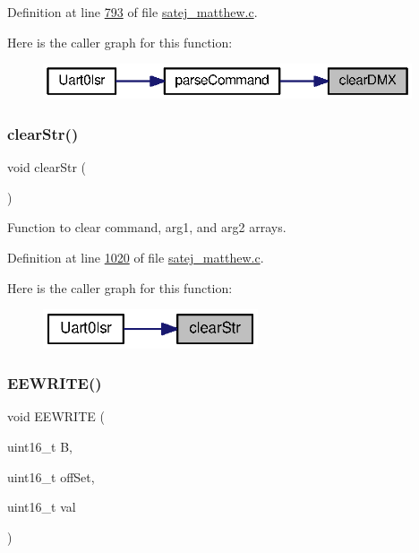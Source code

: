 Definition at line \mbox{\hyperlink{satej__matthew_8c_source_l00793}{793}} of file \mbox{\hyperlink{satej__matthew_8c_source}{satej\+\_\+matthew.\+c}}.

Here is the caller graph for this function\+:\nopagebreak
\begin{figure}[H]
\begin{center}
\leavevmode
\includegraphics[width=309pt]{satej__matthew_8c_a90f05ed3280bc7f2e971ed7216028960_icgraph}
\end{center}
\end{figure}
\mbox{\label{satej__matthew_8c_a595edd7ef79a70fc4dccbca4b2cf0deb}} 
\subsubsection{\texorpdfstring{clearStr()}{clearStr()}}
{\footnotesize\ttfamily void clear\+Str (\begin{DoxyParamCaption}{ }\end{DoxyParamCaption})}



Function to clear command, arg1, and arg2 arrays. 



Definition at line \mbox{\hyperlink{satej__matthew_8c_source_l01020}{1020}} of file \mbox{\hyperlink{satej__matthew_8c_source}{satej\+\_\+matthew.\+c}}.

Here is the caller graph for this function\+:\nopagebreak
\begin{figure}[H]
\begin{center}
\leavevmode
\includegraphics[width=180pt]{satej__matthew_8c_a595edd7ef79a70fc4dccbca4b2cf0deb_icgraph}
\end{center}
\end{figure}
\mbox{\label{satej__matthew_8c_a31b9c21cfe092a5574eb605046951401}} 
\subsubsection{\texorpdfstring{EEWRITE()}{EEWRITE()}}
{\footnotesize\ttfamily void E\+E\+W\+R\+I\+TE (\begin{DoxyParamCaption}\item[{uint16\+\_\+t}]{B,  }\item[{uint16\+\_\+t}]{off\+Set,  }\item[{uint16\+\_\+t}]{val }\end{DoxyParamCaption})}



